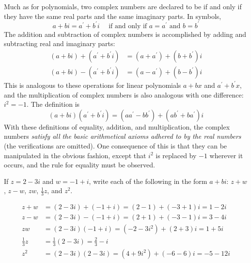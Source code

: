 \documentclass{ximera}
\begin{document}
Much as for polynomials, two complex numbers are declared to be  if and only if they have the same real parts and the same imaginary parts. In symbols,
\begin{equation*}
a+bi = a^{\prime} + b^{\prime} i \quad \mbox{ if and only if } a = a^{\prime} \mbox{ and } b = b^{\prime}
\end{equation*}
The addition and subtraction of complex numbers is accomplished by adding and subtracting real and imaginary parts:
\begin{align*}
(a+bi) + (a^{\prime} + b^{\prime}i) & = (a + a^{\prime}) + (b + b^{\prime})i\\
(a+bi) - (a^{\prime} + b^{\prime}i) & = (a - a^{\prime}) + (b - b^{\prime})i
\end{align*}
This is analogous to these operations for linear polynomials $a + bx$ and $a^{\prime} + b^{\prime}x$, and the multiplication of complex numbers is also analogous with one difference: $i^{2} = -1$. The definition is
\begin{equation*}
(a+bi)(a^{\prime} + b^{\prime}i) = (a a^{\prime} - b b^{\prime}) + (a b^{\prime} + b a^{\prime})i
\end{equation*}
With these definitions of equality, addition, and multiplication, the complex numbers \textit{satisfy all the basic arithmetical axioms adhered to by the real numbers} (the verifications are omitted). One consequence of this is that they can be manipulated in the obvious fashion, except that $i^{2}$ is replaced by $-1$ wherever it occurs, and the rule for equality must be observed.

\begin{example}\label{ex:033865}
If $z = 2 - 3i$ and $w = -1 + i$, write each of the following in the form $a + bi$: $z + w$, $z - w$, $zw$, $\frac{1}{3}z$, and $z^{2}$.

\begin{explanation}
\begin{align*}
z+w & = (2-3i) + (-1+i) = (2-1) + (-3+1)i = 1-2i \\
z-w & = (2-3i) - (-1+i) = (2+1) + (-3-1)i = 3-4i \\
zw &= (2-3i)(-1+i) = (-2-3i^2) + (2+3)i = 1+5i \\
\frac{1}{3}z &= \frac{1}{3}(2-3i) = \frac{2}{3}-i \\
z^2 &=(2-3i)(2-3i) = (4+9i^2) + (-6-6)i = -5-12i
\end{align*}
\end{explanation}
\end{example}
\end{document}
